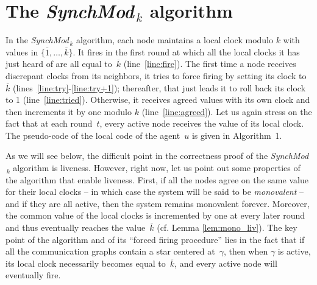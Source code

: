 \documentclass{article}
\newcommand{\cent}{\gamma}
\newcommand{\SM}{{\em SynchMod}$_{\,k}$ }
\begin{document}
\section{The \SM algorithm}

In the \SM algorithm, each node  maintains a local clock modulo $k$ with values in $\{ \overline{1}, \dots,  \overline{k} \}$.
It fires in the first round at which all the local clocks it has just heard of  are all equal to~$\overline{k} $ (line~\ref{line:fire}).
The first time a node receives discrepant clocks from its neighbors, it tries to force firing  by setting its clock to  $\overline{k} $
	(lines~\ref{line:try}-\ref{line:try+1});
	thereafter, that  just leads it to roll back its clock to 1 (line~\ref{line:tried}).
Otherwise, it receives agreed values with its own clock and then increments it by one modulo $k$ (line~\ref{line:agreed}).
Let us again stress on the fact that at each round~$t$, every active node receives the value of its local clock.
The pseudo-code of the local code of the agent~$u$ is given in Algorithm~1.

As we will see below, the difficult point in the correctness proof of the \SM algorithm is liveness.
However, right now, let us point out some properties of the algorithm that enable liveness.
First, if all the nodes  agree on the same value for their local clocks 
	-- in which case the system will be said to be \emph{monovalent} -- and if they are all active, 
	then the system remains monovalent forever.
Moreover, the common value of the local clocks is incremented by one at every later round and thus eventually 
	reaches the value~$\overline{k} $ (cf. Lemma \ref{lem:mono_liv}).
The key point of the algorithm and of its ``forced firing procedure'' lies in the fact that if all the communication graphs  
	contain a star centered at~$\cent$, then when  $\cent$ is active, its local clock necessarily becomes equal 
	to~$\overline{k}$, and every active node will eventually fire. 

\end{document}
